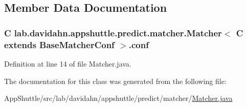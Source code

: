 \subsection{\-Member \-Data \-Documentation}
\hypertarget{classlab_1_1davidahn_1_1appshuttle_1_1predict_1_1matcher_1_1_matcher_3_01_c_01extends_01_base_matcher_conf_01_4_a9efef0213a9c667fc2c0fdc859c73cd2}{
\subsubsection[{conf}]{\setlength{\rightskip}{0pt plus 5cm}\-C lab.\-davidahn.\-appshuttle.\-predict.\-matcher.\-Matcher$<$ \-C extends {\bf \-Base\-Matcher\-Conf} $>$.{\bf conf}}}\label{classlab_1_1davidahn_1_1appshuttle_1_1predict_1_1matcher_1_1_matcher_3_01_c_01extends_01_base_matcher_conf_01_4_a9efef0213a9c667fc2c0fdc859c73cd2}


\-Definition at line 14 of file \-Matcher.\-java.



\-The documentation for this class was generated from the following file\-:\begin{DoxyCompactItemize}
\item 
\-App\-Shuttle/src/lab/davidahn/appshuttle/predict/matcher/\hyperlink{_matcher_8java}{\-Matcher.\-java}\end{DoxyCompactItemize}
